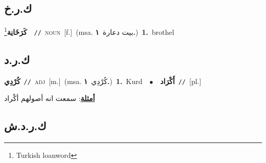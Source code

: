\documentclass[10pt,a4paper,twoside]{article} %
\begin{document}
\begin{multicols}{2}
\vspace{-3mm}
\subsection*{\color{blue}\foreignlanguage{arabic}{ك.ر.خ}\color{blue}{}} 

{\setlength\topsep{0pt}\textbf{\foreignlanguage{arabic}{كَرَخَانِة}}\footnote{Turkish loanword}\ \ {\color{gray}\texttt{//}\color{black}}\ \textsc{noun}\ [f.]\ \color{gray}(msa. \foreignlanguage{arabic}{بيت دعارة}~\foreignlanguage{arabic}{\textbf{١.}})\color{black}\ \textbf{1.}~brothel\ } \vspace{2mm}

\vspace{-3mm}
\subsection*{\color{blue}\foreignlanguage{arabic}{ك.ر.د}\color{blue}{}} 

{\setlength\topsep{0pt}\textbf{\foreignlanguage{arabic}{كُرْدِي}}\ {\color{gray}\texttt{//}\color{black}}\ \textsc{adj}\ [m.]\ \color{gray}(msa. \foreignlanguage{arabic}{كُرْدِي}~\foreignlanguage{arabic}{\textbf{١.}})\color{black}\ \textbf{1.}~Kurd\ \ $\bullet$\ \ \setlength\topsep{0pt}\textbf{\foreignlanguage{arabic}{أَكْرَاد}}\ {\color{gray}\texttt{//}\color{black}}\ [pl.]\  \begin{flushright}\color{gray}\foreignlanguage{arabic}{\textbf{\underline{\foreignlanguage{arabic}{أمثلة}}}: سمعت انه أصولهم أكْراد}\end{flushright}\color{black}} \vspace{2mm}

\vspace{-3mm}
\subsection*{\color{blue}\foreignlanguage{arabic}{ك.ر.د.ش}\color{blue}{}} 


\end{multicols}
\end{document}
